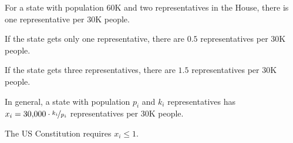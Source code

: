 \documentclass[preview, border={0pt 1pt 1pt 1pt}, varwidth=12cm]{standalone} %
\begin{document}





    For a state with population \(60\)K and two representatives in the House,
    there is one representative per \(30\)K people.
    \vspace{0.7em}

    If the state gets only one representative, there are \(0.5\) representatives per \(30\)K people.\\ 
    \vspace{0.7em}

    If the state gets three representatives, there are \(1.5\) representatives per \(30\)K people.\\
    \vspace{0.7em}

    In general, a state with population \(p_i\) and \(k_i\) representatives
    has \( x_i = 30{,}000 \cdot \nicefrac{k_i}{p_i}\) representatives per \(30\)K people.\\
    \vspace{0.7em}

    The US Constitution requires \(x_i \leq 1\).
\end{document}

